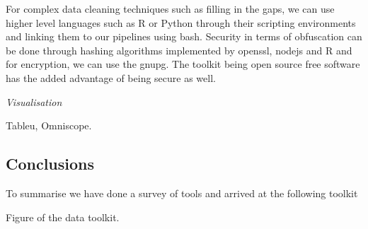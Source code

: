 For complex data cleaning techniques such as filling in the gaps, we can use higher level languages such as R or Python through their scripting environments and linking them to our pipelines using bash.
Security in terms of obfuscation can be done through hashing algorithms implemented by openssl, nodejs and R and for encryption, we can use the gnupg.
The toolkit being open source free software has the added advantage of being secure as well.


\vspace{1.5em}\noindent\textit{Visualisation}\vspace{0.5em}

Tableu, Omniscope.


\subsection{Conclusions}

To summarise we have done a survey of tools and arrived at the following toolkit

Figure of the data toolkit.
